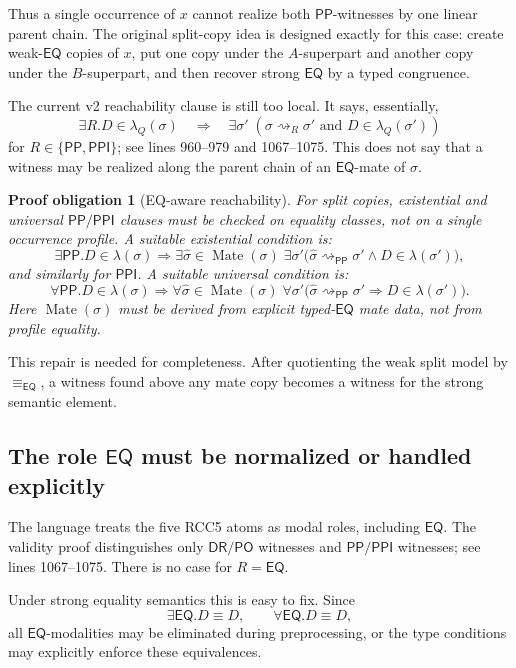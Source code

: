 \documentclass[11pt]{article}
\newcommand{\PP}{\mathsf{PP}}
\newcommand{\PPI}{\mathsf{PPI}}
\newcommand{\PO}{\mathsf{PO}}
\newcommand{\DR}{\mathsf{DR}}
\newcommand{\EQ}{\mathsf{EQ}}
\newcommand{\reach}{\rightsquigarrow}
\newcommand{\eqcong}{\equiv_{\EQ}}
\newcommand{\Mate}{\operatorname{Mate}}
\newtheorem{obligation}{Proof obligation}
\begin{document}
Thus a single occurrence of \(x\) cannot realize both \(\PP\)-witnesses by one
linear parent chain.  The original split-copy idea is designed exactly for this
case: create weak-\(\EQ\) copies of \(x\), put one copy under the \(A\)-superpart
and another copy under the \(B\)-superpart, and then recover strong \(\EQ\) by a
typed congruence.

The current v2 reachability clause is still too local.  It says, essentially,
\[
  \exists R.D\in\lambda_Q(\sigma)
  \quad\Longrightarrow\quad
  \exists\sigma'\; (\sigma\reach_R\sigma'\text{ and }D\in\lambda_Q(\sigma'))
\]
for \(R\in\{\PP,\PPI\}\); see lines 960--979 and 1067--1075.  This does not
say that a witness may be realized along the parent chain of an \(\EQ\)-mate of
\(\sigma\).

\begin{obligation}[EQ-aware reachability]
For split copies, existential and universal \(\PP/\PPI\) clauses must be checked
on equality classes, not on a single occurrence profile.  A suitable
existential condition is:
\[
  \exists\PP.D\in\lambda(\sigma)
  \Rightarrow
  \exists\widehat\sigma\in\Mate(\sigma)\;\exists\sigma'
  \bigl(\widehat\sigma\reach_{\PP}\sigma'\wedge D\in\lambda(\sigma')\bigr),
\]
and similarly for \(\PPI\).  A suitable universal condition is:
\[
  \forall\PP.D\in\lambda(\sigma)
  \Rightarrow
  \forall\widehat\sigma\in\Mate(\sigma)\;\forall\sigma'
  \bigl(\widehat\sigma\reach_{\PP}\sigma'\Rightarrow D\in\lambda(\sigma')\bigr).
\]
Here \(\Mate(\sigma)\) must be derived from explicit typed-\(\EQ\) mate data,
not from profile equality.
\end{obligation}

This repair is needed for completeness.  After quotienting the weak split model
by \(\eqcong\), a witness found above any mate copy becomes a witness for the
strong semantic element.

\subsection{The role \texorpdfstring{$\EQ$}{EQ} must be normalized or handled explicitly}

The language treats the five RCC5 atoms as modal roles, including \(\EQ\).  The
validity proof distinguishes only \(\DR/\PO\) witnesses and \(\PP/\PPI\) witnesses;
see lines 1067--1075.  There is no case for \(R=\EQ\).

Under strong equality semantics this is easy to fix.  Since
\[
  \exists\EQ.D \equiv D,
  \qquad
  \forall\EQ.D \equiv D,
\]
all \(\EQ\)-modalities may be eliminated during preprocessing, or the type
conditions may explicitly enforce these equivalences.
\end{document}
